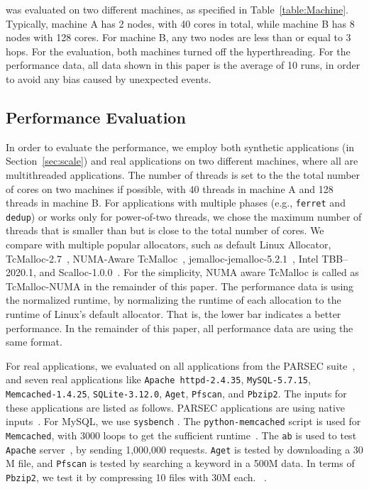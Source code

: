 \NM{} was evaluated on two different machines, as specified in Table~\ref{table:Machine}. Typically, machine A has 2 nodes, with 40 cores in total, while machine B has 8 nodes with 128 cores. For machine B, any two nodes are less than or equal to 3 hops. For the evaluation, both machines turned off the hyperthreading. For the performance data, all data shown in this paper is the average of 10 runs, in order to avoid any bias caused by unexpected events.  

\subsection{Performance Evaluation}

\label{sec:performance}

In order to evaluate the performance, we employ both synthetic applications (in Section~\ref{sec:scale}) and real applications on two different machines, where all are multithreaded applications. The number of threads is set to the the total number of cores on two machines if possible, with 40 threads in machine A and 128 threads in machine B. For applications with multiple phases (e.g., \texttt{ferret} and \texttt{dedup}) or works only for power-of-two threads, we chose the maximum number of threads that is smaller than but is close to the total number of cores.  We compare \NM{} with multiple popular allocators, such as default Linux Allocator, TcMalloc-2.7~\cite{tcmalloc}, NUMA-Aware TcMalloc~\cite{tcmallocnew}, jemalloc-jemalloc-5.2.1~\cite{jemalloc}, Intel TBB--2020.1, and Scalloc-1.0.0~\cite{Scalloc}. For the simplicity, NUMA aware TcMalloc is called as TcMalloc-NUMA in the remainder of this paper. The performance data is using the normalized runtime, by normalizing the runtime of each allocation to the runtime of Linux's default   allocator. That is, the lower bar indicates a better performance. In the remainder of this paper, all performance data are using the same format. 

For real applications, we evaluated on all applications from the PARSEC suite~\cite{parsec}, and seven real applications like \texttt{Apache httpd-2.4.35}, \texttt{MySQL-5.7.15}, \texttt{Memcached-1.4.25}, \texttt{SQLite-3.12.0}, \texttt{Aget}, \texttt{Pfscan}, and \texttt{Pbzip2}. 
The inputs for these applications are listed as follows. PARSEC applications are using native inputs~\cite{parsec}. For MySQL, we use \texttt{sysbench} . The \texttt{python-memcached} script is used for \texttt{Memcached}, with 3000 loops to get the sufficient runtime~\cite{memcached}. The  \texttt{ab} is used to test \texttt{Apache} server~\cite{apachetest}, by sending 1,000,000 requests. \texttt{Aget} is tested  by downloading a 30 M file, and \texttt{Pfscan} is tested by searching  a keyword in a 500M data. In terms of \texttt{Pbzip2}, we test it by compressing 10 files with 30M each. ~\cite{sqlitetest}. 

